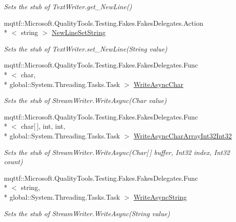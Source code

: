 \begin{DoxyCompactItemize}
\begin{DoxyCompactList}\small\item\em Sets the stub of Text\-Writer.\-get\-\_\-\-New\-Line()\end{DoxyCompactList}\item 
mqttf\-::\-Microsoft.\-Quality\-Tools.\-Testing.\-Fakes.\-Fakes\-Delegates.\-Action\\*
$<$ string $>$ \hyperlink{class_system_1_1_i_o_1_1_fakes_1_1_stub_stream_writer_aa08d81baeaf110a948fe0472775b65dd}{New\-Line\-Set\-String}
\begin{DoxyCompactList}\small\item\em Sets the stub of Text\-Writer.\-set\-\_\-\-New\-Line(\-String value)\end{DoxyCompactList}\item 
mqttf\-::\-Microsoft.\-Quality\-Tools.\-Testing.\-Fakes.\-Fakes\-Delegates.\-Func\\*
$<$ char, \\*
global\-::\-System.\-Threading.\-Tasks.\-Task $>$ \hyperlink{class_system_1_1_i_o_1_1_fakes_1_1_stub_stream_writer_a7fb5a4e4a3d0c9e2ffcdc0c03b8481e0}{Write\-Async\-Char}
\begin{DoxyCompactList}\small\item\em Sets the stub of Stream\-Writer.\-Write\-Async(\-Char value)\end{DoxyCompactList}\item 
mqttf\-::\-Microsoft.\-Quality\-Tools.\-Testing.\-Fakes.\-Fakes\-Delegates.\-Func\\*
$<$ char\mbox{[}$\,$\mbox{]}, int, int, \\*
global\-::\-System.\-Threading.\-Tasks.\-Task $>$ \hyperlink{class_system_1_1_i_o_1_1_fakes_1_1_stub_stream_writer_a24fa5b1a4a483f0d352aa65527434e66}{Write\-Async\-Char\-Array\-Int32\-Int32}
\begin{DoxyCompactList}\small\item\em Sets the stub of Stream\-Writer.\-Write\-Async(\-Char\mbox{[}$\,$\mbox{]} buffer, Int32 index, Int32 count)\end{DoxyCompactList}\item 
mqttf\-::\-Microsoft.\-Quality\-Tools.\-Testing.\-Fakes.\-Fakes\-Delegates.\-Func\\*
$<$ string, \\*
global\-::\-System.\-Threading.\-Tasks.\-Task $>$ \hyperlink{class_system_1_1_i_o_1_1_fakes_1_1_stub_stream_writer_a96dc734adcd2a96689d80d67cc1d7189}{Write\-Async\-String}
\begin{DoxyCompactList}\small\item\em Sets the stub of Stream\-Writer.\-Write\-Async(\-String value)\end{DoxyCompactList}\item 

\end{DoxyCompactItemize}
